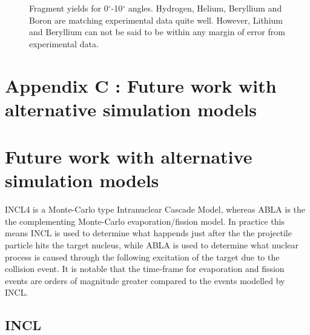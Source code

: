 \begin{figure}[!ht]
{\label{fig:fragmentYieldsForB}
}
\label{fig:fragmentYieldsZeroToTenDegrees}
\caption[Optional caption for list of figures]{Fragment yields for 0$^{\circ}$-10$^{\circ}$ angles. Hydrogen, Helium, Beryllium and Boron are matching experimental data quite well. However, Lithium and Beryllium can not be said to be within any margin of error from experimental data.}
\end{figure}

\clearpage
{}
\section*{Appendix C \label{AppendixC}: Future work with alternative simulation models}
\renewcommand{\theequation}{C\arabic{equation}}
\setcounter{equation}{0}  
\renewcommand{\thefigure}{C\arabic{figure}}
\setcounter{figure}{0}
\renewcommand{\thetable}{C\arabic{table}}
\setcounter{table}{0}
\renewcommand{\thesection}{C}
\setcounter{section}{1}
\setcounter{subsection}{0}
\section*{Future work with alternative simulation models \label{appendixincltheory}}

INCL4 is a Monte-Carlo type Intranuclear Cascade Model, whereas ABLA is the the complementing Monte-Carlo evaporation/fission model. In practice this means INCL is used to determine what happends just after the the projectile particle hits the target nucleus, while ABLA is used to determine what nuclear process is caused through the following excitation of the target due to the collision event. It is notable that the time-frame for evaporation and fission events are orders of magnitude greater compared to the events modelled by INCL.

\subsection{INCL}

